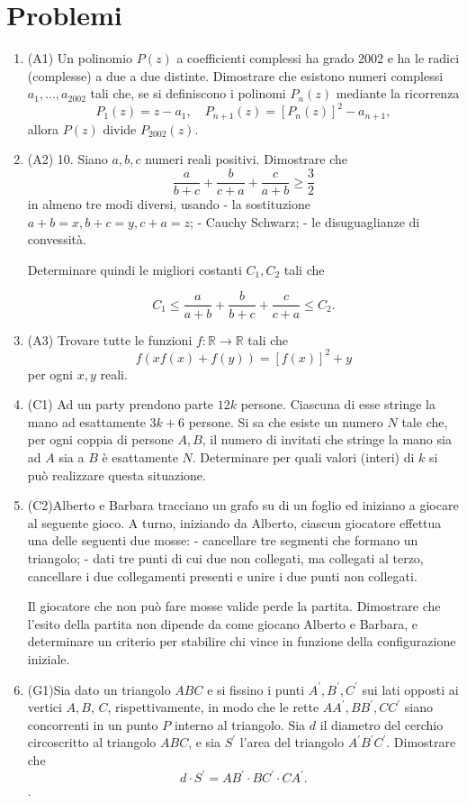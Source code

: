\documentclass[11pt]{scrartcl}
\begin{document}
\section{Problemi}
\begin{enumerate}[\bfseries 1.]
\item %
  (A1)
Un polinomio $P(z)$ a coefficienti complessi ha grado 2002 e ha le
radici (complesse) a due a due distinte.
Dimostrare che esistono numeri complessi $a_1, \ldots, a_{2002}$
tali che, se si definiscono i polinomi $P_n(z)$ mediante la ricorrenza
\[
  P_1(z)=z-a_1, \quad P_{n+1}(z)=\left[P_n(z)\right]^2-a_{n+1},
\]
allora $P(z)$ divide $P_{2002}(z)$.

\item %
  (A2)
10. Siano $a, b, c$ numeri reali positivi. Dimostrare che
$$
\frac{a}{b+c}+\frac{b}{c+a}+\frac{c}{a+b} \geq \frac{3}{2}
$$
in almeno tre modi diversi, usando
- la sostituzione $a+b=x, b+c=y, c+a=z$;
- Cauchy Schwarz;
- le disuguaglianze di convessità.

Determinare quindi le migliori costanti $C_1, C_2$ tali che

\[
  C_1 \leq \frac{a}{a+b}+\frac{b}{b+c}+\frac{c}{c+a} \leq C_2 .
\]

\item %
  (A3)
Trovare tutte le funzioni $f: \mathbb{R} \rightarrow \mathbb{R}$ tali che
$$
f(x f(x)+f(y))=[f(x)]^2+y
$$
per ogni $x, y$ reali.

\item %
  (C1) Ad un party prendono parte $12 k$ persone.
Ciascuna di esse stringe la mano ad esattamente $3 k+6$ persone.
Si sa che esiste un numero $N$ tale che, per ogni coppia di persone
$A, B$, il numero di invitati che stringe la mano sia ad $A$ sia a $B$
è esattamente $N$.
Determinare per quali valori (interi) di $k$ si può realizzare
questa situazione.

\item %
  (C2)Alberto e Barbara tracciano un grafo su di un foglio ed iniziano
a giocare al seguente gioco. A turno, iniziando da Alberto,
ciascun giocatore effettua una delle seguenti due mosse:
- cancellare tre segmenti che formano un triangolo;
- dati tre punti di cui due non collegati, ma collegati al terzo,
cancellare i due collegamenti presenti e unire i due punti non collegati.

Il giocatore che non può fare mosse valide perde la partita.
Dimostrare che l'esito della partita non dipende da come giocano
Alberto e Barbara, e determinare un criterio per stabilire chi vince
in funzione della configurazione iniziale.
\item %
  (G1)Sia dato un triangolo $A B C$ e si fissino i punti $A^{\prime}, B^{\prime}, C^{\prime}$
sui lati opposti ai vertici $A, B$, $C$, rispettivamente,
in modo che le rette $A A^{\prime}, B B^{\prime}, C C^{\prime}$
siano concorrenti in un punto $P$ interno al triangolo.
Sia $d$ il diametro del cerchio circoscritto al triangolo $A B C$,
e sia $S^{\prime}$ l'area del triangolo $A^{\prime} B^{\prime} C^{\prime}$.
Dimostrare che
$$
d \cdot S^{\prime}=A B^{\prime} \cdot B C^{\prime} \cdot C A^{\prime} .
$$.


\end{enumerate}
\end{document}
